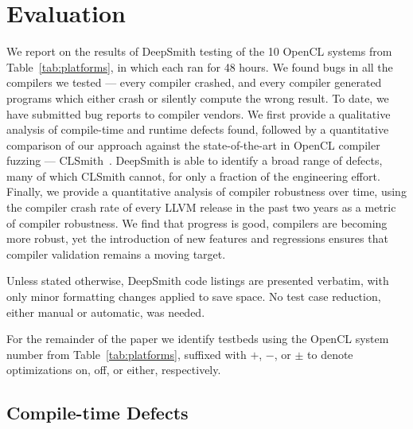 \section{Evaluation}%
\label{sec:eval}



\noindent
We report on the results of DeepSmith testing of the 10 OpenCL systems from Table~\ref{tab:platforms}, in which each ran for 48 hours.  We found bugs in all the compilers we tested --- every compiler crashed, and every compiler generated programs which either crash or silently compute the wrong result. To date, we have submitted  bug reports to compiler vendors. We first provide a qualitative analysis of compile-time and runtime defects found, followed by a quantitative comparison of our approach against the state-of-the-art in OpenCL compiler fuzzing --- CLSmith~\cite{Lidbury2015a}. DeepSmith is able to identify a broad range of defects, many of which CLSmith cannot, for only a fraction of the engineering effort. Finally, we provide a quantitative analysis of compiler robustness over time, using the compiler crash rate of every LLVM release in the past two years as a metric of compiler robustness. We find that progress is good, compilers are becoming more robust, yet the introduction of new features and regressions ensures that compiler validation remains a moving target.


Unless stated otherwise, DeepSmith code listings are presented verbatim, with only minor formatting changes applied to save space. No test case reduction, either manual or automatic, was needed.


For the remainder of the paper we identify testbeds using the OpenCL system number from Table~\ref{tab:platforms}, suffixed with $+$, $-$, or $\pm$ to denote optimizations on, off, or either, respectively.

\subsection{Compile-time Defects}%
\label{subsec:compile-time-defects}

